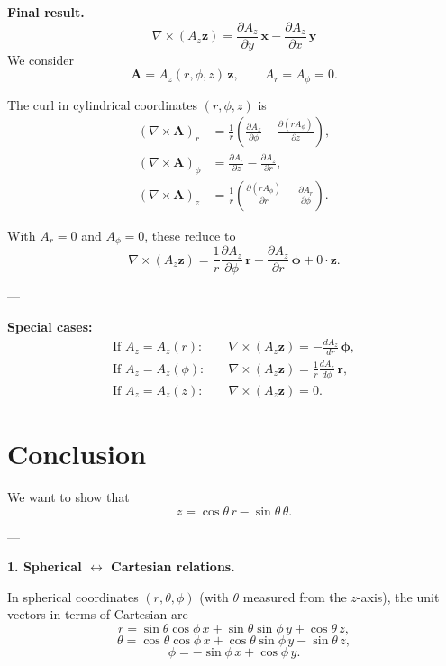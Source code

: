 \documentclass{article}
\def\hat#1{#1}%
\begin{document}
\textbf{Final result.}
\[
\boxed{\;\nabla \times (A_z \hat{\mathbf z})
= \frac{\partial A_z}{\partial y}\,\hat{\mathbf x}
- \frac{\partial A_z}{\partial x}\,\hat{\mathbf y}\;}
\]
We consider
\[
\mathbf{A} = A_z(r,\phi,z)\,\hat{\mathbf z},
\qquad A_r = A_\phi = 0.
\]

The curl in cylindrical coordinates $(r,\phi,z)$ is
\[
\begin{aligned}
(\nabla \times \mathbf{A})_r 
&= \frac{1}{r}\!\left(\frac{\partial A_z}{\partial \phi} - \frac{\partial (r A_\phi)}{\partial z}\right), \\[6pt]
(\nabla \times \mathbf{A})_\phi 
&= \frac{\partial A_r}{\partial z} - \frac{\partial A_z}{\partial r}, \\[6pt]
(\nabla \times \mathbf{A})_z 
&= \frac{1}{r}\!\left(\frac{\partial (r A_\phi)}{\partial r} - \frac{\partial A_r}{\partial \phi}\right).
\end{aligned}
\]

With $A_r=0$ and $A_\phi=0$, these reduce to
\[
\nabla \times (A_z \hat{\mathbf z})
= \frac{1}{r}\frac{\partial A_z}{\partial \phi}\,\hat{\mathbf r}
- \frac{\partial A_z}{\partial r}\,\hat{\boldsymbol\phi}
+ 0 \cdot \hat{\mathbf z}.
\]

---

\textbf{Special cases:}
\[
\begin{aligned}
\text{If } A_z = A_z(r): &\quad
\nabla \times (A_z \hat{\mathbf z}) 
= -\frac{dA_z}{dr}\,\hat{\boldsymbol\phi},
\\[6pt]
\text{If } A_z = A_z(\phi): &\quad
\nabla \times (A_z \hat{\mathbf z}) 
= \frac{1}{r}\frac{dA_z}{d\phi}\,\hat{\mathbf r},
\\[6pt]
\text{If } A_z = A_z(z): &\quad
\nabla \times (A_z \hat{\mathbf z}) = 0.
\end{aligned}
\]
\section{Conclusion}
We want to show that
\[
\hat{z} = \cos\theta \, \hat{r} - \sin\theta \, \hat{\theta}.
\]

---

\textbf{1. Spherical $\leftrightarrow$ Cartesian relations.}

In spherical coordinates $(r,\theta,\phi)$ (with $\theta$ measured from the $z$-axis), the unit vectors in terms of Cartesian are
\[
\hat{r} = \sin\theta \cos\phi \, \hat{x} 
        + \sin\theta \sin\phi \, \hat{y} 
        + \cos\theta \, \hat{z},
\]
\[
\hat{\theta} = \cos\theta \cos\phi \, \hat{x} 
             + \cos\theta \sin\phi \, \hat{y} 
             - \sin\theta \, \hat{z},
\]
\[
\hat{\phi} = -\sin\phi \, \hat{x} + \cos\phi \, \hat{y}.
\]
\end{document}
